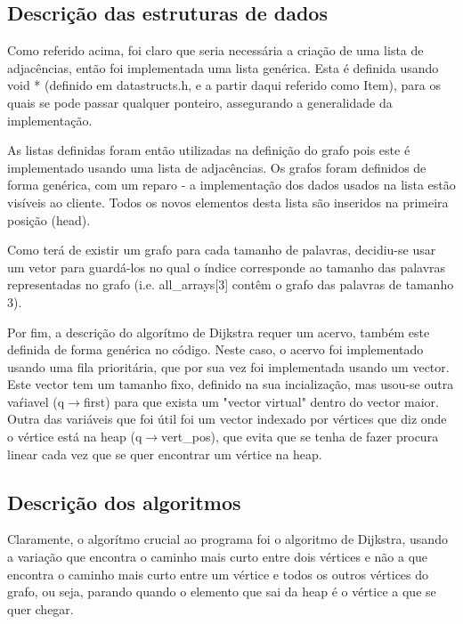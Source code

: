 \documentclass[a4paper, 11pt]{article}
\begin{document}
\subsection{Descrição das estruturas de dados}
    \par Como referido acima, foi claro que seria necessária a criação de uma lista de adjacências, então foi implementada uma lista genérica. Esta é definida usando void * (definido em datastructs.h, e a partir daqui referido como Item), para os quais se pode passar qualquer ponteiro, assegurando a generalidade da implementação.
    \par As listas definidas foram então utilizadas na definição do grafo pois este é implementado usando uma lista de adjacências. Os grafos foram definidos de forma genérica, com um reparo - a implementação dos dados usados na lista estão visíveis ao cliente. Todos os novos elementos desta lista são inseridos na primeira posição (head).
    \par Como terá de existir um grafo para cada tamanho de palavras, decidiu-se usar um vetor para guardá-los no qual o índice corresponde ao tamanho das palavras representadas no grafo (i.e. all{\_}arrays[3] contêm o grafo das palavras de tamanho 3).
    \par Por fim, a descrição do algorítmo de Dijkstra requer um acervo, também este definida de forma genérica no código. Neste caso, o acervo foi implementado usando uma fila prioritária, que por sua vez foi implementada usando um vector. Este vector tem um tamanho fixo, definido na sua incialização, mas usou-se outra vaŕiavel (q$\rightarrow$first) para que exista um "vector virtual"  dentro do vector maior. Outra das variáveis que foi útil foi um vector indexado por vértices que diz onde o vértice está na heap (q$\rightarrow$vert{\_}pos), que evita que se tenha de fazer procura linear cada vez que se quer encontrar um vértice na heap.
    
\subsection{Descrição dos algoritmos}
    \par Claramente, o algorítmo crucial ao programa foi o algoritmo de Dijkstra, usando a variação que encontra o caminho mais curto entre dois vértices e não a que encontra o caminho mais curto entre um vértice e todos os outros vértices do grafo, ou seja, parando quando o elemento que sai da heap é o vértice a que se quer chegar.
\end{document}
